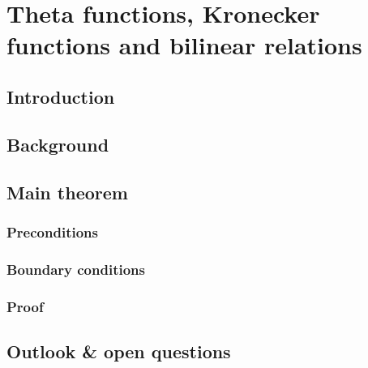 


\chapter{Theta functions, Kronecker functions and bilinear relations}
\label{rep:B12}

\section{Introduction}

\section{Background}

\section{Main theorem}
\subsection{Preconditions}
\subsection{Boundary conditions}
\subsection{Proof}
\section{Outlook \& open questions}




